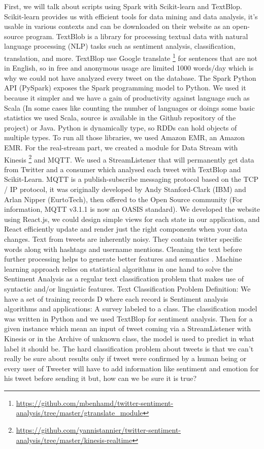 \documentclass{acmtog} %
\begin{document}
First, we will talk about scripts using Spark with Scikit-learn and TextBlop. Scikit-learn provides us with efficient tools for data mining and data analysis, it’s usable in various contexts and can be downloaded on their website as an open-source program. TextBlob is a library for processing textual data with natural language processing (NLP) \cite{Saif12} tasks such as sentiment analysis, classification, translation, and more. TextBlop use Google translate \footnote{\url{https://github.com/mbenhamd/twitter-sentiment-analysis/tree/master/gtranslate_module}} for sentences that are not in English, so in free and anonymous usage are limited 1000 words/day which is why we could not have analyzed every tweet on the database. The Spark Python API (PySpark) exposes the Spark programming model to Python. We used it because it simpler and we have a gain of productivity against language such as Scala (In some cases like counting the number of languages or doings some basic statistics we used Scala, source is available in the Github repository of the project) or Java. Python is dynamically type, so RDDs can hold objects of multiple types. To run all those libraries, we used Amazon EMR, an Amazon EMR. For the real-stream part, we created a module for Data Stream with Kinesis \footnote{\url{https://github.com/yannistannier/twitter-sentiment-analysis/tree/master/kinesis-realtime}} and MQTT. We used a StreamListener that will permanently get data from Twitter and a consumer which analysed each tweet with TextBlop and Scikit-Learn.
MQTT is a publish-subscribe messaging protocol based on the TCP / IP protocol, it was originally developed by Andy Stanford-Clark (IBM) and Arlan Nipper (EurtoTech), then offered to the Open Source community (For information, MQTT v3.1.1 is now an OASIS standard). We developed the website using React.js, we could design simple views for each state in our application, and React efficiently update and render just the right components when your data changes. Text from tweets are inherently noisy. They contain twitter specific words along with hashtags and username mentions. Cleaning the text before further processing helps to generate better features and semantics \cite{Saif12}.
Machine learning approach relies on statistical algorithms in one hand to solve the Sentiment Analysis as a regular text classification problem that makes use of syntactic and/or linguistic features. Text Classification Problem Definition: We have a set of training records D where each record is Sentiment analysis algorithms and applications: A survey labeled to a class. The classification model was written in Python and we used TextBlop for sentiment analysis. Then for a given instance which mean an input of tweet coming via a StreamListener with Kinesis or in the Archive of unknown class, the model is used to predict in what label it should be. The hard classification problem about tweets is that we can’t really be sure about results only if tweet were confirmed by a human being or every user of Tweeter will have to add information like sentiment and emotion for his tweet before sending it but, how can we be sure it is true?
\end{document}
